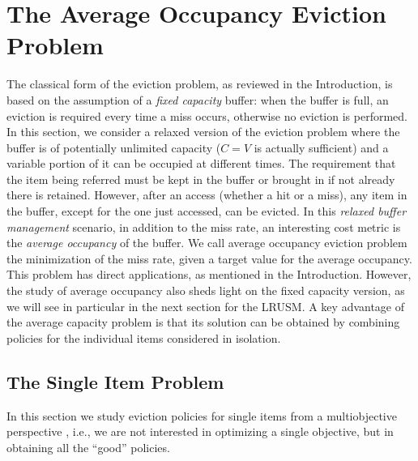 \documentclass[11pt,a4paper]{article}
\theoremstyle{definition}
\theoremstyle{remark}
\begin{document}
\section{The Average Occupancy Eviction Problem}
\label{sec:relax-buff-manag}

The classical form of the eviction problem, as reviewed in the
Introduction, is based on the assumption of a \emph{fixed capacity}
buffer: when the buffer is full, an eviction is required every time a
miss occurs, otherwise no eviction is performed. In this section, we
consider a relaxed version of the eviction problem where the buffer
is of potentially unlimited capacity ($C=V$ is actually sufficient)
and a variable portion of it can be occupied at different times. The
requirement that the item being referred must be kept in the buffer or
brought in if not already there is retained. However, after an access
(whether a hit or a miss), any item in the buffer, except for the one
just accessed, can be evicted. In this \emph{relaxed buffer
management} scenario, in addition to the miss rate, an interesting
cost metric is the \emph{average occupancy} of the buffer.  We call
average occupancy eviction problem the minimization of the miss
rate, given a target value for the average occupancy. This problem has
direct applications, as mentioned in the Introduction. However, the
study of average occupancy also sheds light on the fixed capacity
version, as we will see in particular in the next section for the
LRUSM.  A key advantage of the average capacity problem is that its
solution can be obtained by combining policies for the individual
items considered in isolation.


\subsection{The Single Item Problem}
\label{sec:one-item-eviction}

In this section we study eviction policies for single items from a
multiobjective perspective \cite{Ehrgott05,Miettinen99}, i.e., we are not
interested in optimizing a single objective, but in obtaining all the ``good''
policies.
\end{document}

